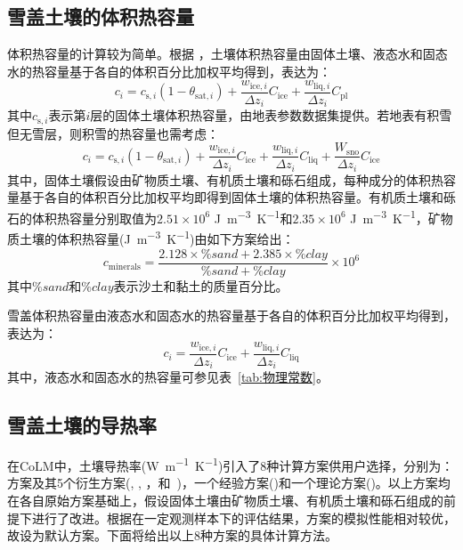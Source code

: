 \subsection{雪盖土壤的体积热容量}

体积热容量的计算较为简单。根据 \citet{de1963thermal}，土壤体积热容量由固体土壤、液态水和固态水的热容量基于各自的体积百分比加权平均得到，表达为：
\begin{equation}
  c_{i}=c_{\mathrm{s},i}\left(1-\theta_{\mathrm {sat},i}\right)+\frac{w_{\mathrm{ice},i}}{\Delta z_{i}} C_{\mathrm{ice}}+\frac{w_{\mathrm{liq},i}}{\Delta z_{i}} C_{\mathrm{p l}}
\end{equation}
其中$c_{\mathrm{s},i}$表示第$i$层的固体土壤体积热容量，由地表参数数据集提供。若地表有积雪但无雪层，则积雪的热容量也需考虑：
\begin{equation}
  c_{i}=c_{\mathrm{s},i}\left(1-\theta_{\mathrm {sat},i}\right)+\frac{w_{\mathrm{ice},i}}{\Delta z_{i}} C_{\mathrm{ice}}+\frac{w_{\mathrm{liq},i}}{\Delta z_{i}} C_{\mathrm{liq}}+\frac{W_{\mathrm{sno}}}{\Delta z_{i}} C_{\mathrm{ice}}
\end{equation}
其中，固体土壤假设由矿物质土壤、有机质土壤和砾石组成，每种成分的体积热容量基于各自的体积百分比加权平均即得到固体土壤的体积热容量。有机质土壤和砾石的体积热容量分别取值为$2.51\times 10^6$ \unit{J.m^{-3}.K^{-1}}和$2.35\times 10^6$ \unit{J.m^{-3}.K^{-1}}，矿物质土壤的体积热容量(\unit{J.m^{-3}.K^{-1}})由如下方案给出：$$c_{\mathrm{minerals}}=\frac{2.128\times\%sand+2.385\times\%clay}{\%sand+\%clay}\times10^6$$
其中$\%sand$和$\%clay$表示沙土和黏土的质量百分比。

雪盖体积热容量由液态水和固态水的热容量基于各自的体积百分比加权平均得到，表达为：
\begin{equation}
  c_{i}=\frac{w_{\mathrm{ice},i}}{\Delta z_{i}} C_{\mathrm{ice}}+\frac{w_{\mathrm{liq},i}}{\Delta z_{i}} C_{\mathrm{liq}}
\end{equation}
其中，液态水和固态水的热容量可参见表~\ref{tab:物理常数}。

\subsection{雪盖土壤的导热率}

在CoLM中，土壤导热率(\unit{W.m^{-1}.K^{-1}})引入了8种计算方案供用户选择，分别为：\citet{Johansen1975}方案及其5个衍生方案(\citet{farouki1981thermal}, \citet{cote2005}, \citet{balland2005}，\citet{lu2007improved}和~\citet{Yan2019thermal})，一个经验方案(\citet{tarnawski2012series})和一个理论方案(\citet{de1963thermal})。以上方案均在各自原始方案基础上，假设固体土壤由矿物质土壤、有机质土壤和砾石组成的前提下进行了改进。根据\citep{dai2019evaluation}在一定观测样本下的评估结果，\citet{balland2005}方案的模拟性能相对较优，故设为默认方案。下面将给出以上8种方案的具体计算方法。

